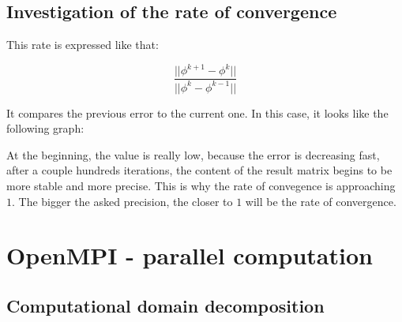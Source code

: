 \documentclass[a4paper,11pt]{article}
\begin{document}
\subsection{Investigation of the rate of convergence}

This rate is expressed like that:

\[
  \frac{||\phi^{k+1}-\phi^{k}||}{||\phi^{k}-\phi^{k-1}||}
\]

It compares the previous error to the current one. In this case, it looks like the following
graph:



At the beginning, the value is really low, because the error is decreasing fast, after a couple
hundreds iterations, the content of the result matrix begins to be more stable and more precise.
This is why the rate of convegence is approaching $1$. The bigger the asked precision, the closer
to $1$ will be the rate of convergence.

\clearpage  

\section{OpenMPI - parallel computation}

\subsection{Computational domain decomposition}
\end{document}
